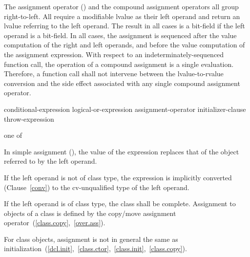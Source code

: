 \pnum
{}%
%
%
%
%
%
%
%
%
%
%
%
The assignment operator (\tcode{=}) and the compound assignment
operators all group right-to-left.
%
All
require a modifiable lvalue as their left operand and return an lvalue
referring to the left operand. The result in all cases is a bit-field if
the left operand is a bit-field. In all cases, the assignment is
sequenced after the
%
value computation of the right and left operands,
and before the
value computation of the assignment expression. With
respect to an indeterminately-sequenced function call, the operation of
a compound assignment is a single evaluation.
\enternote
Therefore, a function call shall not intervene between the
lvalue-to-rvalue conversion and the side effect associated with any
single compound assignment operator.
\exitnote

\begin{bnf}
\br
    conditional-expression\br
    logical-or-expression assignment-operator initializer-clause\br
    throw-expression
\end{bnf}

\begin{bnf}
 \textnormal{one of}\br
    \terminal{=  *=  /=  \%=   +=  -=  \shr=  \shl=  \&=  \^{}=  |=}
\end{bnf}

\pnum
In simple assignment (\tcode{=}), the value of the expression replaces
that of the object referred to by the left operand.

\pnum
{}%
If the left operand is not of class type, the expression is implicitly
converted (Clause~\ref{conv}) to the cv-unqualified type of the left
operand.

\pnum
{}%
%
If the left operand is of class type, the class shall be complete.
Assignment to objects of a class is defined by the copy/move assignment
operator~(\ref{class.copy},~\ref{over.ass}).

\pnum
\enternote 
For class objects, assignment is not in general the same as
initialization~(\ref{dcl.init},~\ref{class.ctor},~\ref{class.init},~\ref{class.copy}).
\exitnote 

